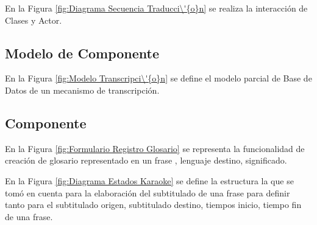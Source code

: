 En la Figura \ref{fig:Diagrama Secuencia Traducci\'{o}n} se realiza la 
interacci\'{o}n de Clases y Actor.

\begin{minipage}{1.0\textwidth}
	\centering
	\label{fig:Diagrama Secuencia Traducci\'{o}n}
\end{minipage}

\subsection{Modelo de Componente}

En la Figura \ref{fig:Modelo Transcripci\'{o}n}	se define el modelo parcial de 
Base de Datos de un mecanismo de transcripci\'{o}n.

\begin{minipage}{1.0\textwidth}
	\centering
	\label{fig:Modelo Transcripci\'{o}n}
\end{minipage}

\subsection{Componente}

En la Figura \ref{fig:Formulario Registro Glosario} se representa la
funcionalidad de creaci\'{o}n de glosario representado en un frase
, lenguaje destino, significado. 

\begin{minipage}{1.0\textwidth}
	\centering
	\label{fig:Formulario Registro Glosario}
\end{minipage}

En la Figura \ref{fig:Diagrama Estados Karaoke} se define la estructura la
que se tom\'{o} en cuenta para la elaboraci\'{o}n del subtitulado de una frase
para definir tanto para el subtitulado origen, subtitulado destino, tiempos 
inicio, tiempo fin de una frase.

\begin{minipage}{1.0\textwidth}
	\centering
	\label{fig:Diagrama Estados Karaoke}
\end{minipage}

